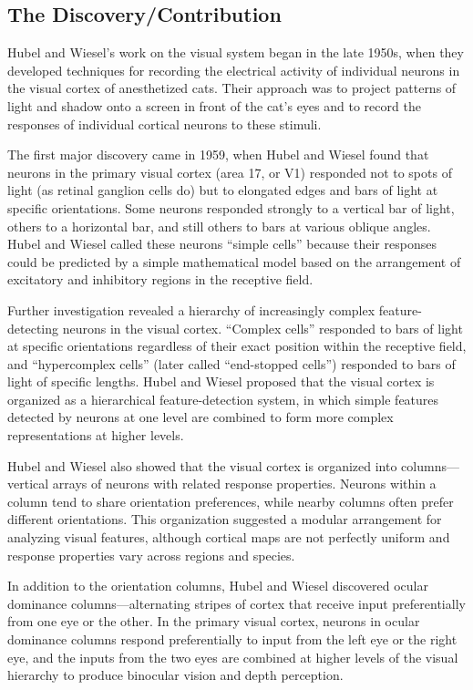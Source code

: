 \subsection{The Discovery/Contribution}

Hubel and Wiesel's work on the visual system began in the late 1950s, when they developed techniques for recording the electrical activity of individual neurons in the visual cortex of anesthetized cats. Their approach was to project patterns of light and shadow onto a screen in front of the cat's eyes and to record the responses of individual cortical neurons to these stimuli.

The first major discovery came in 1959, when Hubel and Wiesel found that neurons in the primary visual cortex (area 17, or V1) responded not to spots of light (as retinal ganglion cells do) but to elongated edges and bars of light at specific orientations. Some neurons responded strongly to a vertical bar of light, others to a horizontal bar, and still others to bars at various oblique angles. Hubel and Wiesel called these neurons ``simple cells'' because their responses could be predicted by a simple mathematical model based on the arrangement of excitatory and inhibitory regions in the receptive field.

Further investigation revealed a hierarchy of increasingly complex feature-detecting neurons in the visual cortex. ``Complex cells'' responded to bars of light at specific orientations regardless of their exact position within the receptive field, and ``hypercomplex cells'' (later called ``end-stopped cells'') responded to bars of light of specific lengths. Hubel and Wiesel proposed that the visual cortex is organized as a hierarchical feature-detection system, in which simple features detected by neurons at one level are combined to form more complex representations at higher levels.

Hubel and Wiesel also showed that the visual cortex is organized into columns---vertical arrays of neurons with related response properties. Neurons within a column tend to share orientation preferences, while nearby columns often prefer different orientations. This organization suggested a modular arrangement for analyzing visual features, although cortical maps are not perfectly uniform and response properties vary across regions and species.

In addition to the orientation columns, Hubel and Wiesel discovered ocular dominance columns---alternating stripes of cortex that receive input preferentially from one eye or the other. In the primary visual cortex, neurons in ocular dominance columns respond preferentially to input from the left eye or the right eye, and the inputs from the two eyes are combined at higher levels of the visual hierarchy to produce binocular vision and depth perception.

